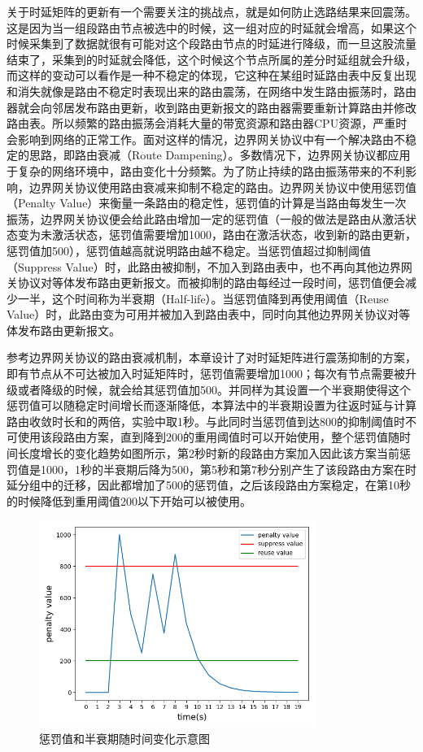 关于时延矩阵的更新有一个需要关注的挑战点，就是如何防止选路结果来回震荡。这是因为当一组段路由节点被选中的时候，这一组对应的时延就会增高，如果这个时候采集到了数据就很有可能对这个段路由节点的时延进行降级，而一旦这股流量结束了，采集到的时延就会降低，这个时候这个节点所属的差分时延组就会升级，而这样的变动可以看作是一种不稳定的体现，它这种在某组时延路由表中反复出现和消失就像是路由不稳定时表现出来的路由震荡，在网络中发生路由振荡时，路由器就会向邻居发布路由更新，收到路由更新报文的路由器需要重新计算路由并修改路由表。所以频繁的路由振荡会消耗大量的带宽资源和路由器CPU资源，严重时会影响到网络的正常工作。面对这样的情况，边界网关协议中有一个解决路由不稳定的思路，即路由衰减（Route Dampening）。多数情况下，边界网关协议都应用于复杂的网络环境中，路由变化十分频繁。为了防止持续的路由振荡带来的不利影响，边界网关协议使用路由衰减来抑制不稳定的路由。边界网关协议中使用惩罚值（Penalty Value）来衡量一条路由的稳定性，惩罚值的计算是当路由每发生一次振荡，边界网关协议便会给此路由增加一定的惩罚值（一般的做法是路由从激活状态变为未激活状态，惩罚值需要增加1000，路由在激活状态，收到新的路由更新，惩罚值加500），惩罚值越高就说明路由越不稳定。当惩罚值超过抑制阈值（Suppress Value）时，此路由被抑制，不加入到路由表中，也不再向其他边界网关协议对等体发布路由更新报文。而被抑制的路由每经过一段时间，惩罚值便会减少一半，这个时间称为半衰期（Half-life）。当惩罚值降到再使用阈值（Reuse Value）时，此路由变为可用并被加入到路由表中，同时向其他边界网关协议对等体发布路由更新报文。

参考边界网关协议的路由衰减机制，本章设计了对时延矩阵进行震荡抑制的方案，即有节点从不可达被加入时延矩阵时，惩罚值需要增加1000；每次有节点需要被升级或者降级的时候，就会给其惩罚值加500。并同样为其设置一个半衰期使得这个惩罚值可以随稳定时间增长而逐渐降低，本算法中的半衰期设置为往返时延与计算路由收敛时长和的两倍，实验中取1秒。与此同时当惩罚值到达800的抑制阈值时不可使用该段路由方案，直到降到200的重用阈值时可以开始使用，整个惩罚值随时间长度增长的变化趋势如图所示，第2秒时新的段路由方案加入因此该方案当前惩罚值是1000，1秒的半衰期后降为500，第5秒和第7秒分别产生了该段路由方案在时延分组中的迁移，因此都增加了500的惩罚值，之后该段路由方案稳定，在第10秒的时候降低到重用阈值200以下开始可以被使用。

\begin{figure}[htbp]
\setlength{\abovecaptionskip}{15pt plus 3pt minus 2pt}
\centerline{\includegraphics[width=0.8\textwidth]{./figures/ch4-penalty-value.png}}
\caption{惩罚值和半衰期随时间变化示意图}
\label{fig-ch4-penalty-value}
\end{figure}

